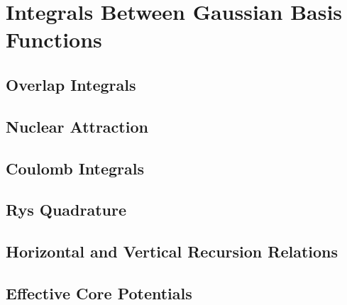 \chapter{Integrals Between Gaussian Basis Functions}
\label{Integrals_Chapter}

\section{Overlap Integrals}

\section{Nuclear Attraction}

\section{Coulomb Integrals}

\section{Rys Quadrature}

\section{Horizontal and Vertical Recursion Relations}

\section{Effective Core Potentials}

